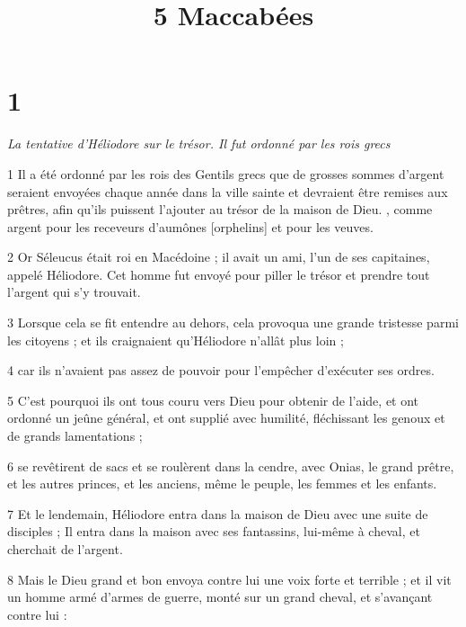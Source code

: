 

\title{5 Maccabées}


\chapter{1}

\par \textit{La tentative d'Héliodore sur le trésor. Il fut ordonné par les rois grecs}

\par 1 Il a été ordonné par les rois des Gentils grecs que de grosses sommes d'argent seraient envoyées chaque année dans la ville sainte et devraient être remises aux prêtres, afin qu'ils puissent l'ajouter au trésor de la maison de Dieu. , comme argent pour les receveurs d'aumônes [orphelins] et pour les veuves.

\par 2 Or Séleucus était roi en Macédoine ; il avait un ami, l'un de ses capitaines, appelé Héliodore. Cet homme fut envoyé pour piller le trésor et prendre tout l'argent qui s'y trouvait.

\par 3 Lorsque cela se fit entendre au dehors, cela provoqua une grande tristesse parmi les citoyens ; et ils craignaient qu'Héliodore n'allât plus loin ;

\par 4 car ils n'avaient pas assez de pouvoir pour l'empêcher d'exécuter ses ordres.

\par 5 C'est pourquoi ils ont tous couru vers Dieu pour obtenir de l'aide, et ont ordonné un jeûne général, et ont supplié avec humilité, fléchissant les genoux et de grands lamentations ;

\par 6 se revêtirent de sacs et se roulèrent dans la cendre, avec Onias, le grand prêtre, et les autres princes, et les anciens, même le peuple, les femmes et les enfants.

\par 7 Et le lendemain, Héliodore entra dans la maison de Dieu avec une suite de disciples ; Il entra dans la maison avec ses fantassins, lui-même à cheval, et cherchait de l'argent.

\par 8 Mais le Dieu grand et bon envoya contre lui une voix forte et terrible ; et il vit un homme armé d'armes de guerre, monté sur un grand cheval, et s'avançant contre lui :

